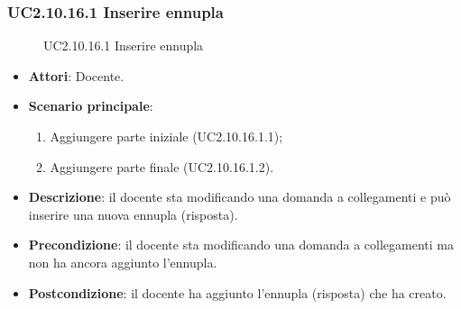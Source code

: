 \subsubsection{UC2.10.16.1 Inserire ennupla}
\begin{figure}[H]
\centering
\noindent{}
\caption{UC2.10.16.1 Inserire ennupla}
\end{figure}
\begin{itemize}
\item \textbf{Attori}: Docente.
\item \textbf{Scenario principale}:
\begin{enumerate}
\item Aggiungere parte iniziale (UC2.10.16.1.1);
\item Aggiungere parte finale (UC2.10.16.1.2).
\end{enumerate}
\item \textbf{Descrizione}: il docente sta modificando una domanda a collegamenti e può inserire una nuova ennupla (risposta).
\item \textbf{Precondizione}: il docente sta modificando una domanda a collegamenti ma non ha ancora aggiunto l'ennupla.
\item \textbf{Postcondizione}: il docente ha aggiunto l'ennupla (risposta) che ha creato.
\end{itemize}
